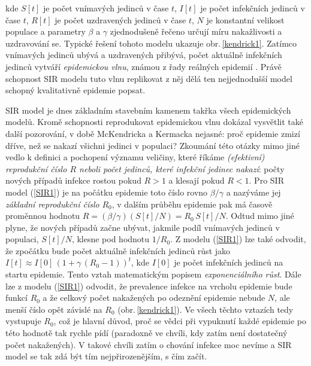 kde $S[t]$ je počet vnímavých jedinců v čase $t$, $I[t]$ je počet infekčních jedinců v čase $t$, $R[t]$ je počet uzdravených jedinců v čase $t$, $N$ je konstantní velikost populace a parametry $\beta$ a $\gamma$ zjednodušeně řečeno určují míru nakažlivosti a uzdravování se. Typické řešení tohoto modelu ukazuje obr.\,\ref{kendrick1}. Zatímco vnímavých jedinců ubývá a uzdravených přibývá, počet aktuálně infekčních jedinců vytváří \emph{epidemickou vlnu}, známou z řady reálných epidemií \cite{Bell_etal2016,Finger_etal2019}. Právě schopnost SIR modelu tuto vlnu replikovat z něj dělá ten nejjednodušší model schopný kvalitativně epidemie popsat.  

SIR model je dnes základním stavebním kamenem takřka všech epidemických modelů. Kromě schopnosti reprodukovat epidemickou vlnu dokázal vysvětlit také další pozorování, v době McKendricka a Kermacka nejasné: proč epidemie zmizí dříve, než se nakazí všichni jedinci v populaci? Zkoumání této otázky mimo jiné vedlo k definici a pochopení významu veličiny, které říkáme \emph{(efektivní) reprodukční číslo $R$ neboli počet jedinců, které infekční jedinec nakazí}: počty nových případů infekce rostou pokud $R>1$ a klesají pokud $R<1$. Pro SIR model (\ref{SIR1}) je na počátku epidemie toto číslo rovno $\beta/\gamma$ a nazýváme jej \emph{základní reprodukční číslo} $R_0$, v dalším průběhu epidemie pak má časově proměnnou hodnotu $R = (\beta/\gamma)(S[t]/N) = R_0 \,S[t] / N$. Odtud mimo jiné plyne, že nových případů začne ubývat, jakmile podíl vnímavých jedinců v populaci, $S[t]/N$, klesne pod hodnotu $1/R_0$. Z modelu (\ref{SIR1}) lze také odvodit, že zpočátku bude počet aktuálně infekčních jedinců růst jako $I[t] \approx I[0]\,(1+\gamma\,(R_0-1))^t$, kde $I[0]$ je počet infekčních jedinců na startu epidemie. Tento vztah matematickým popisem \emph{exponenciálního růst}. Dále lze z modelu (\ref{SIR1}) odvodit, že prevalence infekce na vrcholu epidemie bude funkcí $R_0$ a že celkový počet nakažených po odeznění epidemie nebude $N$, ale menší číslo opět závislé na $R_0$ (obr.\,\ref{kendrick1}). Ve všech těchto vztazích tedy vystupuje $R_0$, což je hlavní důvod, proč se vědci při vypuknutí každé epidemie po této hodnotě tak rychle pídí (paradoxně ve chvíli, kdy zatím není dostatečný počet nakažených). V takové chvíli zatím o chování infekce moc nevíme a SIR model se tak zdá být tím nejpřirozenějším, s čím začít. 

